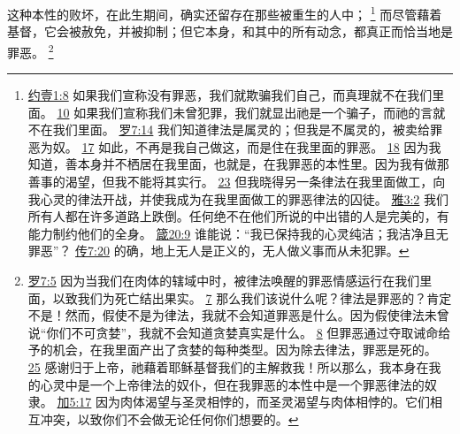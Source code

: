 \documentclass[12pt, a4paper, oneside]{ctexart}
\newcounter{parnum}[section]
\newcommand{\N}{%
   \noindent\refstepcounter{parnum}%
    \makebox[\parindent][l]{\textbf{\arabic{parnum}.}}}
\begin{document}
\N 这种本性的败坏，在此生期间，确实还留存在那些被重生的人中；
	\footnote {
		\href{https://biblehub.com/1_john/1-8.htm}{约壹1:8} 如果我们宣称没有罪恶，我们就欺骗我们自己，而真理就不在我们里面。
		\href{https://biblehub.com/1_john/1-10.htm}{10} 如果我们宣称我们未曾犯罪，我们就显出祂是一个骗子，而祂的言就不在我们里面。
		\href{https://biblehub.com/romans/7-14.htm}{罗7:14} 我们知道律法是属灵的；但我是不属灵的，被卖给罪恶为奴。
		\href{https://biblehub.com/romans/7-17.htm}{17} 如此，不再是我自己做这，而是住在我里面的罪恶。
        \href{https://biblehub.com/romans/7-18.htm}{18} 因为我知道，善本身并不栖居在我里面，也就是，在我罪恶的本性里。因为我有做那善事的渴望，但我不能将其实行。
		\href{https://biblehub.com/romans/7-23.htm}{23} 但我晓得另一条律法在我里面做工，向我心灵的律法开战，并使我成为在我里面做工的罪恶律法的囚徒。
		\href{https://biblehub.com/james/3-2.htm}{雅3:2} 我们所有人都在许多道路上跌倒。任何绝不在他们所说的中出错的人是完美的，有能力制约他们的全身。
		\href{https://biblehub.com/proverbs/20-9.htm}{箴20:9} 谁能说：“我已保持我的心灵纯洁；我洁净且无罪恶”？
		\href{https://biblehub.com/ecclesiastes/7-20.htm}{传7:20} 的确，地上无人是正义的，无人做义事而从未犯罪。
	}
	而尽管藉着基督，它会被赦免，并被抑制；但它本身，和其中的所有动念，都真正而恰当地是罪恶。
	\footnote {
		\href{https://biblehub.com/romans/7-5.htm}{罗7:5} 因为当我们在肉体的辖域中时，被律法唤醒的罪恶情感运行在我们里面，以致我们为死亡结出果实。
		\href{https://biblehub.com/romans/7-7.htm}{7} 那么我们该说什么呢？律法是罪恶的？肯定不是！然而，假使不是为律法，我就不会知道罪恶是什么。因为假使律法未曾说“你们不可贪婪”，我就不会知道贪婪真实是什么。
		\href{https://biblehub.com/romans/7-8.htm}{8} 但罪恶通过夺取诫命给予的机会，在我里面产出了贪婪的每种类型。因为除去律法，罪恶是死的。
		\href{https://biblehub.com/romans/7-25.htm}{25} 感谢归于上帝，祂藉着耶稣基督我们的主解救我！所以那么，我本身在我的心灵中是一个上帝律法的奴仆，但在我罪恶的本性中是一个罪恶律法的奴隶。
		\href{https://biblehub.com/galatians/5-17.htm}{加5:17} 因为肉体渴望与圣灵相悖的，而圣灵渴望与肉体相悖的。它们相互冲突，以致你们不会做无论任何你们想要的。
	}
\end{document}
